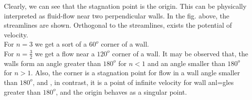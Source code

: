 \documentclass{book}
\begin{document}
\begin{center}
\end{center} 
Clearly, we can see that the stagnation point is the origin. This can be physically interpreted as fluid-flow near two perpendicular walls. In the fig. above, the streamlines are shown. Orthogonal to the streamlines, exists the potential of velocity. \\
For $n=3$ we get a sort of a $60^o$ corner of a wall.\\
For $n=\frac{3}{2}$ we get a flow near a  $120^o$ corner of a wall. It may be observed that, the walls form an angle greater than $180^o$ for $n<1$ and an angle smaller than $180^o$ for $n>1$. Also, the corner is a stagnation point for flow in a wall angle smaller than $180^o$, and , in contrast, it is a point of infinite velocity for wall anl=gles greater than $180^o$, and the origin behaves as a singular point.\\
\end{document}
